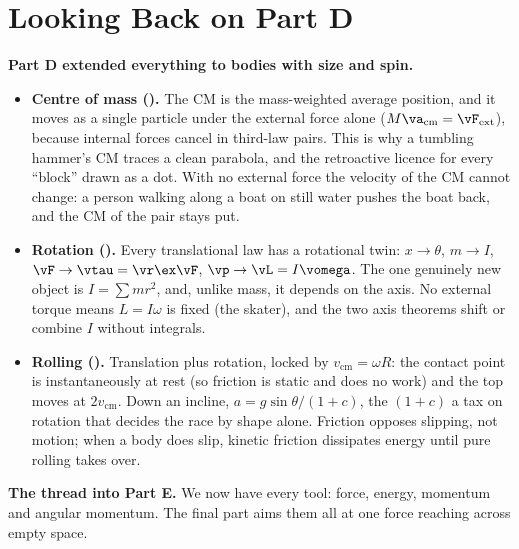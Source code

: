 \section*{Looking Back on Part D}

\textbf{Part D extended everything to bodies with size and spin.}
\begin{itemize}
\item \textbf{Centre of mass ().} The CM is the mass-weighted average position, and it moves as a
single particle under the external force alone ($M\va_{\text{cm}}=\vF_{\text{ext}}$), because
internal forces cancel in third-law pairs. This is why a tumbling hammer's CM traces a clean parabola, and
the retroactive licence for every ``block'' drawn as a dot. With no external force the velocity of the CM cannot change: a person walking along a boat on still water pushes the boat back, and the CM of the pair stays put.
\item \textbf{Rotation ().} Every translational law has a rotational twin: $x\to\theta$, $m\to I$,
$\vF\to\vtau=\vr\ex\vF$, $\vp\to\vL=I\vomega$. The one genuinely new object is $I=\sum mr^2$, and,
unlike mass, it depends on the axis. No external torque means $L=I\omega$ is fixed (the skater), and the
two axis theorems shift or combine $I$ without integrals.
\item \textbf{Rolling ().} Translation plus rotation, locked by $v_{\text{cm}}=\omega R$: the contact
point is instantaneously at rest (so friction is static and does no work) and the top moves at $2v_{\text{cm}}$.
Down an incline, $a=g\sin\theta/(1+c)$, the $(1+c)$ a tax on rotation that decides the race by shape
alone. Friction opposes slipping, not motion; when a body does slip, kinetic friction dissipates energy until
pure rolling takes over.
\end{itemize}
\textbf{The thread into Part E.} We now have every tool: force, energy, momentum and angular momentum. The
final part aims them all at one force reaching across empty space.
